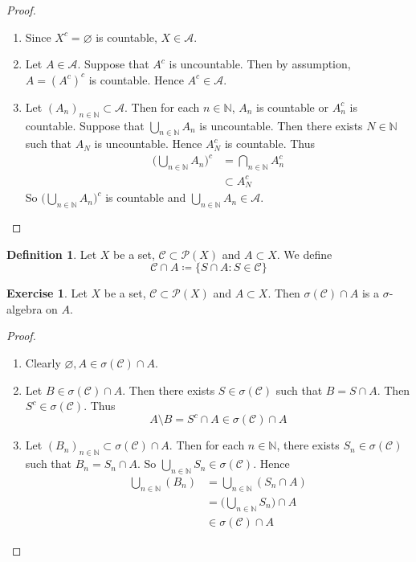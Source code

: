 \documentclass[12pt]{amsart}
\theoremstyle{definition}
\newtheorem{defn}[definition]{Definition}
\newtheorem{ex}[definition]{Exercise}
\newcommand{\sig}{\sigma}
\newcommand{\N}{\mathbb{N}}
\newcommand{\MA}{\mathcal{A}}
\newcommand{\MC}{\mathcal{C}}
\newcommand{\MP}{\mathcal{P}}
\newcommand{\lex}[1]{\label{ex:#1}}
\newcommand{\ld}[1]{\label{defn:#1}}
\begin{document}
	\begin{proof}\
		\begin{enumerate}
			\item Since $X^c = \varnothing$ is countable, $X \in \MA$.
			\item Let $A \in \MA$. Suppose that $A^c$ is  uncountable. Then by assumption, $A = (A^c)^c$ is countable. Hence $A^c \in \MA$.
			\item Let $(A_n)_{n \in \N} \subset \MA$. Then for each $n \in \N$, $A_n$ is countable or $A_n^c$ is countable. Suppose that $\bigcup\limits_{n \in \N}A_n$ is uncountable. Then there exists $N \in \N$ such that $A_N$ is uncountable. Hence $A_N^c$ is countable. Thus 
			\begin{align*}
				\bigg(\bigcup_{n \in \N}A_n \bigg)^c 
				&= \bigcap_{n \in \N}A_n^c \\
				& \subset A_N^c 
			\end{align*}
			So $\bigg(\bigcup\limits_{n \in \N}A_n \bigg)^c $ is countable and $\bigcup\limits_{n \in \N}A_n \in \MA$. 
		\end{enumerate}
	\end{proof}
	
	\begin{defn} \ld{00000} 
		Let $X$ be a set, $\MC \subset \MP(X)$ and $A \subset X$. We define $$\MC \cap A \coloneqq \{S \cap A: S \in \MC\}$$ 
	\end{defn}
	
	\begin{ex} \lex{00000} 
		Let $X$ be a set, $\MC \subset \MP(X)$ and $A \subset X$. Then 
		$\sig(\MC) \cap A$ is a $\sig$-algebra on $A$. 
	\end{ex}
	
	\begin{proof}\
		\begin{enumerate}
			\item Clearly $\varnothing, A \in \sig(\MC) \cap A$.
			\item Let $B \in \sig(\MC) \cap A$. Then there exists $S \in \sig(\MC)$ such that $B = S \cap A$. Then $S^c \in \sig(\MC)$. Thus $$A \setminus B = S^c \cap A \in \sig(\MC) \cap A$$
			\item Let $(B_n)_{n \in \N} \subset \sig(\MC) \cap A$. Then for each $n \in \N$, there exists $S_n \in \sig(\MC)$ such that $B_n = S_n \cap A$. So $\bigcup\limits_{n \in \N}S_n \in \sig(\MC)$. Hence 
			\begin{align*}
				\bigcup_{n \in \N}(B_n) 
				&= \bigcup_{n \in \N}(S_n \cap A) \\
				&= \bigg( \bigcup_{n \in \N}S_n \bigg) \cap A \\
				& \in \sig(\MC) \cap A
			\end{align*}
		\end{enumerate}
	\end{proof}
	
\end{document}
